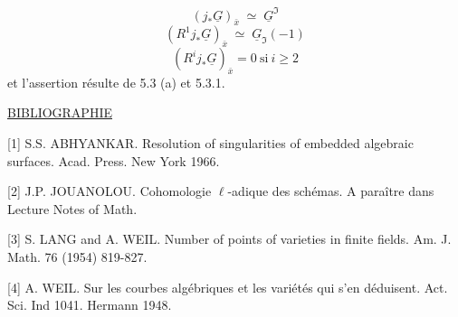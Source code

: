 \begin{equation*}
(j_*\underline{G})_{\bar{x}} \;\simeq\; \underline{G}^{\mathfrak{I}}
\end{equation*}
\begin{equation*}
(R^1 j_*\underline{G})_{\bar{x}} \;\simeq\; \underline{G}_{\mathfrak{I}}(-1)
\end{equation*}
\begin{equation*}
(R^i j_*\underline{G})_{\bar{x}} = 0 \ \text{si} \ i \geq 2
\end{equation*}
et l'assertion résulte de 5.3 (a) et 5.3.1.


\underline{BIBLIOGRAPHIE}

[1]  S.S. ABHYANKAR.  Resolution of singularities of embedded algebraic surfaces. Acad. Press. New York 1966.

[2]  J.P. JOUANOLOU.  Cohomologie $\ell$-adique des schémas. A paraître dans Lecture Notes of Math.

[3]  S. LANG and A. WEIL.  Number of points of varieties in finite fields. Am. J. Math. 76 (1954) 819-827.

[4]  A. WEIL.  Sur les courbes algébriques et les variétés qui s'en déduisent. Act. Sci. Ind 1041. Hermann 1948.
